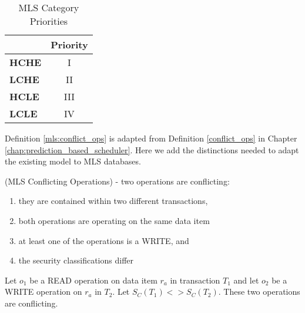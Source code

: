 \begin{definition}
\begin{table}[h]
\captionsetup{justification=centering}
\centering
\begin{tabular}{l|c|}
\cline{2-2}
                                          & \multicolumn{1}{l|}{\textbf{Priority}} \\ \hline
\multicolumn{1}{|l|}{\textbf{HCHE}}  & I                                      \\ \hline
\multicolumn{1}{|l|}{\textbf{LCHE}}  & II                                     \\ \hline
\multicolumn{1}{|l|}{\textbf{HCLE}} & III                                     \\ \hline
\multicolumn{1}{|l|}{\textbf{LCLE}} & IV                                      \\ \hline
\end{tabular}

\caption{MLS Category Priorities} %
\label{tbl:mls_priority} %

\end{table} 
\end{definition}

Definition \ref{mls:conflict_ops} is adapted from Definition \ref{conflict_ops} in Chapter \ref{chap:prediction_based_scheduler}. Here we add the distinctions needed to adapt the existing model to MLS databases.

\begin{definition}
\label{mls:conflict_ops}
 (MLS Conflicting Operations) - two operations are conflicting:

 \begin{enumerate}
   \item they are contained within two different transactions,
   \item both operations are operating on the same data item
   \item at least one of the operations is a WRITE, and
   \item the security classifications differ
 \end{enumerate}

 \begin{example}
 \label{mls:ex_conflict_ops}
  Let $o_{1}$ be a READ operation on data item $r_{a}$ in transaction $T_{1}$ and let $o_{2}$ be a WRITE operation on $r_{a}$ in $T_{2}$. Let $S_C(T_1) <> S_C(T_2)$. These two operations are conflicting.
 \end{example}
\end{definition}